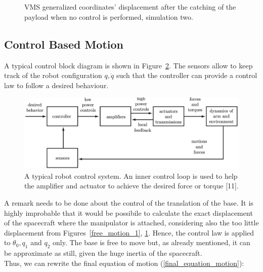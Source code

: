 \documentclass[a4paper,12pt,oneside]{report}
\begin{document}
\begin{figure}[!htb]
  \centering
  \subfloat
  {}\quad
\subfloat
  {} \\
  \subfloat
  {}\quad
  \subfloat
  {}\\
  \subfloat
  {}
  \caption{VMS generalized coordinates' displacement after the catching of the payload when no control is performed, simulation two.}
  \label{free_motion_2}
\end{figure}
\newpage
\FloatBarrier
\subsection{Control Based Motion}
A typical control block diagram is shown in Figure~\ref{block_diagram}. The sensors allow to keep track of the robot configuration $q,\dot{q}$ such that the controller can provide a control law to follow a desired behaviour.\\
\begin{figure}[b]
  \centering
  \includegraphics[scale=0.4]{control_diagram.png}
  \caption{A typical robot control system. An inner control loop is used to help the amplifier and actuator to achieve the desired force or torque [11].}
  \label{block_diagram}
\end{figure}
A remark needs to be done about the control of the translation of the base. It is highly improbable that it would be possibile to calculate the exact displacement of the spacecraft where the manipulator is attached, considering also the too little displacement from Figures~\ref{free_motion_1}, \ref{free_motion_2}. Hence, the control law is applied to $\theta_0, q_1$ and $q_2$ only. The base is free to move but, as already mentioned, it can be approximate as still, given the huge inertia of the spacecraft.\\ 
Thus, we can rewrite the final equation of motion (\ref{final_equation_motion}):
\end{document}
